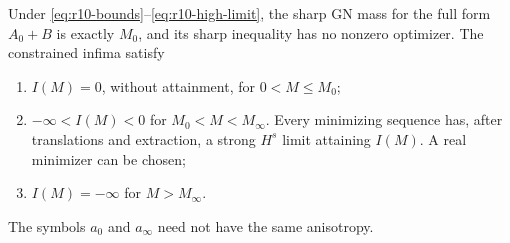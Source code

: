 \begin{theorem}
\label{thm:r10-two-thresholds}
Under \eqref{eq:r10-bounds}--\eqref{eq:r10-high-limit}, the sharp GN
mass for the full form $A_0+B$ is exactly $M_0$, and its sharp inequality
has no nonzero optimizer.  The constrained infima satisfy
\begin{enumerate}
 \item $I(M)=0$, without attainment, for $0<M\le M_0$;
 \item $-\infty<I(M)<0$ for $M_0<M<M_\infty$. Every minimizing
 sequence has, after translations and extraction, a strong $H^s$ limit
 attaining $I(M)$. A real minimizer can be chosen;
 \item $I(M)=-\infty$ for $M>M_\infty$.
\end{enumerate}
The symbols $a_0$ and $a_\infty$ need not have the same anisotropy.
\end{theorem}

